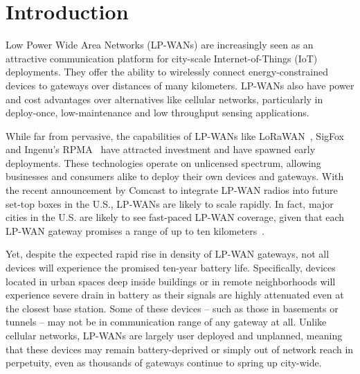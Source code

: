 
\section{Introduction}
\label{sec:intro}

Low Power Wide Area Networks (LP-WANs) are increasingly seen as an attractive
communication platform for city-scale Internet-of-Things (IoT) deployments.
They offer the ability to wirelessly connect energy-constrained devices to
gateways over distances of many kilometers. LP-WANs also have power and cost
advantages over alternatives like cellular networks, particularly in
deploy-once, low-maintenance and low throughput sensing applications.

While far from pervasive, the capabilities of LP-WANs like
LoRaWAN~\cite{Sornin2015, LoRaWanAlliance2015}, SigFox~\cite{centenaro2016}
and Ingenu's RPMA~\cite{Ingenu2015} have attracted investment and have spawned
early deployments. These technologies operate on unlicensed spectrum, allowing
businesses and consumers alike to deploy their own devices and gateways. With
the recent announcement by Comcast \cite{comcast, comcast2} to integrate
LP-WAN radios into future set-top boxes in the U.S., LP-WANs are likely to
scale rapidly. In fact, major cities in the U.S. are likely to see fast-paced
LP-WAN coverage, given that each LP-WAN gateway promises a range of up to ten
kilometers~\cite{LoRaWanAlliance2015}.

Yet, despite the expected rapid rise in density of LP-WAN gateways, not all
devices will experience the promised ten-year battery life. Specifically,
devices located in urban spaces deep inside buildings or in remote
neighborhoods will experience severe drain in battery as their signals are
highly attenuated even at the closest base station. Some of these devices --
such as those in basements or tunnels -- may not be in communication range of
any gateway at all. Unlike cellular networks, LP-WANs are largely user
deployed and unplanned, meaning that these devices may remain battery-deprived
or simply out of network reach in perpetuity, even as thousands of gateways
continue to spring up city-wide.

